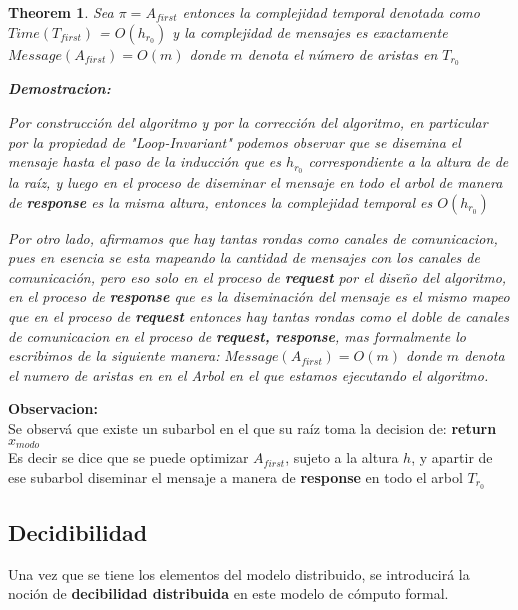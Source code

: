 \documentclass[10pt]{report}
\newtheorem{theorem}{Theorem}
\begin{document}
\begin{theorem}
    Sea $\pi = A_{first}$ entonces la complejidad temporal denotada como $Time(T_{first})$ = $O(h_{r_{0}})$
    y la complejidad de mensajes es exactamente $Message(A_{first}) = O(m)$ donde $m$ denota el número de aristas
    en $T_{r_{0}}$\newline

   \textbf{Demostracion:}
\begin{flushleft}
    Por construcción del algoritmo y por la corrección del algoritmo, en particular por la propiedad de "Loop-Invariant"
    podemos observar que se disemina el mensaje hasta el paso de la inducción que es $h_{r_{0}}$ correspondiente a la altura de
    de la raíz, y luego en el proceso de diseminar el mensaje en todo el arbol de manera de \textbf{response}
    es la misma altura, entonces la complejidad temporal es $O(h_{r_{0}})$

    Por otro lado, afirmamos que hay tantas rondas como canales de comunicacion, pues en esencia se esta mapeando
    la cantidad de mensajes con los canales de comunicación, pero eso solo en el proceso de \textbf{request} por el diseño del
    algoritmo, en el proceso de \textbf{response} que es la diseminación del mensaje es el mismo mapeo que en el proceso
    de \textbf{request} entonces hay tantas rondas como el doble de canales de comunicacion en el proceso de \textbf{request, response},
    mas formalmente lo escribimos de la siguiente manera:
    $Message(A_{first}) = O(m)$ donde $m$ denota el numero de aristas en en el Arbol en el que estamos ejecutando el algoritmo.

\end{flushleft}
\end{theorem}

    \textbf{Observacion:}\\
    Se observá que existe un subarbol en el que su raíz toma la decision de:
    \textbf{return} $x_{modo}$\\
    Es decir se dice que se puede optimizar $A_{first}$, sujeto a la altura $h$, y apartir de ese subarbol diseminar
    el mensaje a manera de \textbf{response} en todo el arbol $T_{r_{0}}$

    \newpage
    \subsection{Decidibilidad}\label{subsec:decidibilidad}
    Una vez que se tiene los elementos del modelo distribuido, se introducirá la noción de \textbf{decibilidad distribuida} en
    este modelo de cómputo formal.
\end{document}
